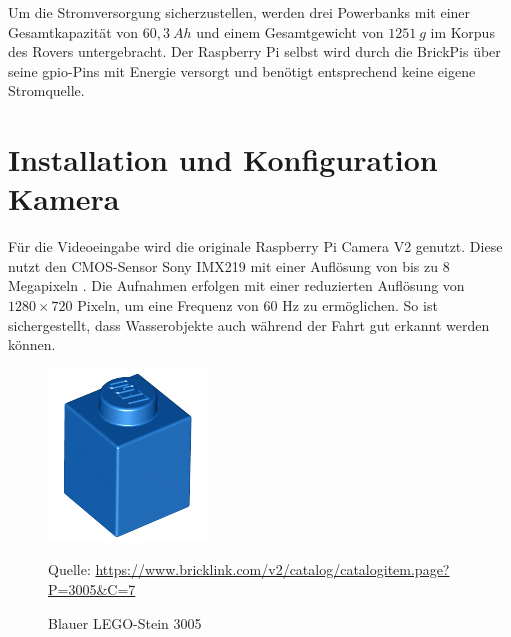 Um die Stromversorgung sicherzustellen, werden drei Powerbanks mit einer Gesamtkapazität von $60{,}3\ Ah$ und einem Gesamtgewicht von $1251\ g$ im Korpus des Rovers untergebracht.
Der Raspberry Pi selbst wird durch die BrickPis über seine \acs{gpio}-Pins mit Energie versorgt \cite{cole2013} und benötigt entsprechend keine eigene Stromquelle.

\section{Installation und Konfiguration Kamera}
\label{sec:inst_konf_kamera}

Für die Videoeingabe wird die originale Raspberry Pi Camera V2 genutzt.
Diese nutzt den CMOS-Sensor Sony IMX219 mit einer Auflösung von bis zu 8 Megapixeln \cite{pagnutti2017}.
Die Aufnahmen erfolgen mit einer reduzierten Auflösung von $1280 \times 720$ Pixeln, um eine Frequenz von 60 Hz zu ermöglichen. 
So ist sichergestellt, dass Wasserobjekte auch während der Fahrt gut erkannt werden können.


\begin{figure}
	\centering
	\includegraphics[width=0.9\linewidth]{../Images/3005.png}
	\vspace{0.5em}
	\parbox[c]{0.8\linewidth}{\footnotesize
		\centering
		\vspace{1em}
		Quelle: \url{https://www.bricklink.com/v2/catalog/catalogitem.page?P=3005\&C=7}
	}
	\captionsetup{format=plain}
	\caption{Blauer LEGO-Stein 3005}
	\label{fig:lego3005}
\end{figure}

